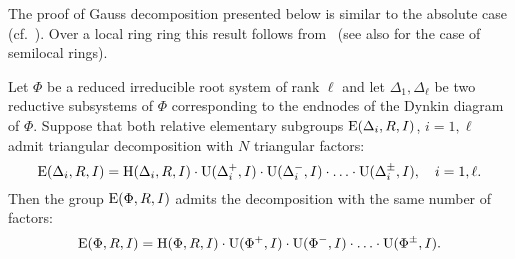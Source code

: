 The proof of Gauss decomposition presented below is similar to the absolute case (cf.~\cite[Theorem~5.1]{Sm12}).
Over a local ring ring this result follows from~\cite[Proposition~2.8]{Abe69} (see also \cite[Proposition~2.3]{AbeSuzNormalSubgroups} for the case of semilocal rings).

\begin{prop}\label{thm:Gauss}
Let $\Phi$ be a reduced irreducible root system of rank $\ell$ and let $\Delta_1, \Delta_\ell$ be
two reductive subsystems of $\Phi$ corresponding to the endnodes of the Dynkin diagram of $\Phi$.
Suppose that both relative elementary subgroups $\operatorname{E}(\Delta_i, R, I)$, $i=1,\ell$ admit triangular decomposition with $N$ triangular factors:
\[ \operatorname{E}(\Delta_i, R, I) = \operatorname{H}(\Delta_i, R, I) \cdot \operatorname{U}(\Delta^+_i, I) \cdot \operatorname{U}(\Delta^-_i, I) \cdot \ldots \cdot \operatorname{U}(\Delta^\pm_i, I),\quad i=1,\ell. \]
Then the group $\operatorname{E}(\Phi, R, I)$ admits the decomposition with the same number of factors:
\[ \operatorname{E}(\Phi, R, I) = \operatorname{H}(\Phi,R,I) \cdot \operatorname{U}(\Phi^+,I) \cdot \operatorname{U}(\Phi^-, I) \cdot \ldots \cdot \operatorname{U}(\Phi^\pm,I). \]
\end{prop}
